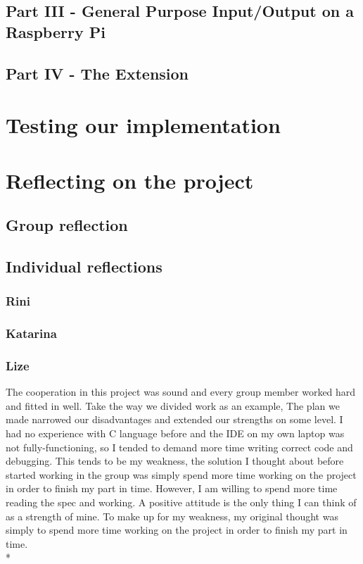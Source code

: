 \documentclass[letterpaper,11pt]{article}
\begin{document}
    \subsection{Part III - General Purpose Input/Output on a Raspberry Pi}
    \subsection{Part IV - The Extension}
    \section{Testing our implementation}
    \section{Reflecting on the project}
    \subsection{Group reflection}
    \subsection{Individual reflections}
    \subsubsection{Rini}
    \subsubsection{Katarina}
    \subsubsection{Lize}
    The cooperation in this project was sound and every group member worked hard and fitted in well. Take the way we divided work as an example, The plan we made narrowed our disadvantages and extended our strengths on some level. I had no experience with C language before and the IDE on my own laptop was not fully-functioning, so I tended to demand more time writing correct code and debugging. This tends to be my weakness, the solution I thought about before started working in the group was simply spend more time working on the project in order to finish my part in time. However, I am willing to spend more time reading the spec and working. A positive attitude is the only thing I can think of as a strength of mine. To make up for my weakness, my original thought was simply to spend more time working on the project in order to finish my part in time.\\*
\end{document}
